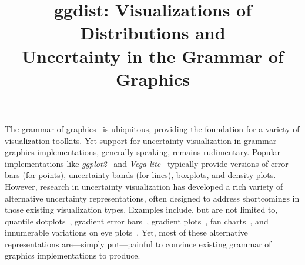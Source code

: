 \documentclass[journal]{vgtc}              %
\title{ggdist: Visualizations of Distributions and\\Uncertainty in the Grammar of Graphics}
\author{%
  \authororcid{Matthew Kay}{0000-0001-9446-0419}
}
\begin{document}


\maketitle



The grammar of graphics~\cite{wilkinson2012grammar} is ubiquitous, providing the foundation for a variety of visualization toolkits. Yet support for uncertainty visualization in grammar graphics implementations, generally speaking, remains rudimentary. Popular implementations like \textit{ggplot2}~\cite{wickham2010layered,wickham2011ggplot2} and \textit{Vega-lite}~\cite{satyanarayan2016vega} typically provide versions of error bars (for points), uncertainty bands (for lines), boxplots, and density plots. However, research in uncertainty visualization has developed a rich variety of alternative uncertainty representations, often designed to address shortcomings in those existing visualization types. Examples include, but are not limited to, quantile dotplots~\cite{kay2016ish,fernandes2018uncertainty}, gradient error bars~\cite{correll2014error}, gradient plots~\cite{bowman2019graphics,jackson2008displaying}, fan charts~\cite{jackson2008displaying}, and innumerable variations on eye plots~\cite{helske2021can,kay2016ish,barrowman2003raindrop,spiegelhalter1999surgical}. Yet, most of these alternative representations are---simply put---painful to convince existing grammar of graphics implementations to produce.
\end{document}
